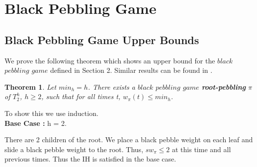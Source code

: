 \documentclass[12pt]{article}
\newtheorem{theorem}{Theorem}[subsection]
\begin{document}
\section{Black Pebbling Game} 

\subsection{Black Pebbling Game Upper Bounds} 

We prove the following theorem which shows an upper bound for the $black$ $pebbling$ $game$ defined in Section 2. Similar results can be found in \cite{c:pebjournal}.

\begin{theorem}
Let $min_h = h$.
There exists a $black$ $pebbling$ $game$ {\bf root-pebbling} $\pi$ of $T^h_2$, $h \geq 2$, such
that for all times t, $w_\pi(t) \le min_h$.
\end{theorem}

\noindent
To show this we use induction.\\



\noindent
{\bf Base Case :} h = 2.

There are 2 children of the root. We place a black pebble weight on each leaf and slide a black pebble weight to the root. Thus, $sw_\pi \leq 2$ at this time and all previous times. Thus the IH is satisfied in the base case.\\




\end{document}
